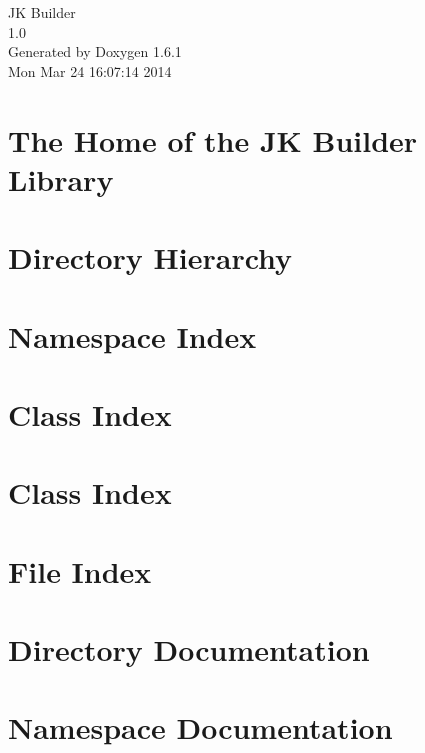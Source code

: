 \documentclass[a4paper]{book}
\begin{document}
\hypersetup{pageanchor=false}
\begin{titlepage}
\vspace*{7cm}
\begin{center}
{\Large JK Builder \\[1ex]\large 1.0 }\\
\vspace*{1cm}
{\large Generated by Doxygen 1.6.1}\\
\vspace*{0.5cm}
{\small Mon Mar 24 16:07:14 2014}\\
\end{center}
\end{titlepage}
\clearemptydoublepage
{}
\tableofcontents
\clearemptydoublepage
{}
\hypersetup{pageanchor=true}
\chapter{The Home of the JK Builder Library}
\label{index}\hypertarget{index}{}
\chapter{Directory Hierarchy}

\chapter{Namespace Index}

\chapter{Class Index}

\chapter{Class Index}

\chapter{File Index}

\chapter{Directory Documentation}

\chapter{Namespace Documentation}




\end{document}
